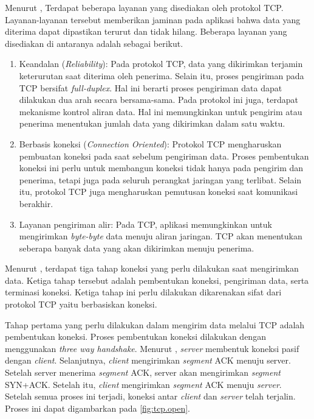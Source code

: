 Menurut \textcite{peterson2011}, Terdapat beberapa layanan yang disediakan oleh protokol TCP. Layanan-layanan tersebut memberikan jaminan pada aplikasi bahwa data yang diterima dapat dipastikan terurut dan tidak hilang. Beberapa layanan yang disediakan di antaranya adalah sebagai berikut.

\begin{enumerate}
  \item Keandalan (\emph{Reliability}): Pada protokol TCP, data yang dikirimkan terjamin keterurutan saat diterima oleh penerima. Selain itu, proses pengiriman pada TCP bersifat \emph{full-duplex}. Hal ini berarti proses pengiriman data dapat dilakukan dua arah secara bersama-sama. Pada protokol ini juga, terdapat mekanisme kontrol aliran data. Hal ini memungkinkan untuk pengirim atau penerima menentukan jumlah data yang dikirimkan dalam satu waktu.
  \item Berbasis koneksi (\emph{Connection Oriented}): Protokol TCP mengharuskan pembuatan koneksi pada saat sebelum pengiriman data. Proses pembentukan koneksi ini perlu untuk membangun koneksi tidak hanya pada pengirim dan penerima, tetapi juga pada seluruh perangkat jaringan yang terlibat. Selain itu, protokol TCP juga mengharuskan pemutusan koneksi saat komunikasi berakhir. 
  \item Layanan pengiriman alir: Pada TCP, aplikasi memungkinkan untuk mengirimkan \emph{byte-byte} data menuju aliran jaringan. TCP akan menentukan seberapa banyak data yang akan dikirimkan menuju penerima.
\end{enumerate}

Menurut \textcite{pratama2015}, terdapat tiga tahap koneksi yang perlu dilakukan saat mengirimkan data. Ketiga tahap tersebut adalah pembentukan koneksi, pengiriman data, serta terminasi koneksi. Ketiga tahap ini perlu dilakukan dikarenakan sifat dari protokol TCP yaitu berbasiskan koneksi.

Tahap pertama yang perlu dilakukan dalam mengirim data melalui TCP adalah pembentukan koneksi. Proses pembentukan koneksi dilakukan dengan menggunakan \emph{three way handshake}. Menurut \textcite{peterson2011}, \emph{server} membentuk koneksi pasif dengan \emph{client}. Selanjutnya, \emph{client} mengirimkan \emph{segment} ACK menuju server. Setelah server menerima \emph{segment} ACK, server akan mengirimkan \emph{segment} SYN+ACK. Setelah itu, \emph{client} mengirimkan \emph{segment} ACK menuju \emph{server}. Setelah semua proses ini terjadi, koneksi antar \emph{client} dan \emph{server} telah terjalin. Proses ini dapat digambarkan pada \ref{fig:tcp.open}. 

